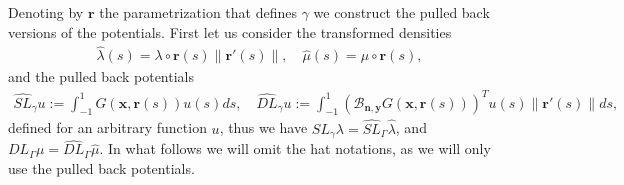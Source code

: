 \documentclass{article}
\newcommand{\bn}{\bm{n}}
\newcommand{\br}{\bm{r}}
\newcommand{\bx}{\bm{x}}
\newcommand{\by}{\bm{y}}
\begin{document}
Denoting by $\br$ the parametrization that defines $\gamma$ we construct the pulled back versions of the potentials. First let us consider the transformed densities 
\begin{align*}
\widehat{\lambda} (s) = \lambda \circ \br(s)  \| \br'(s) \|, \quad 
\widehat{\mu} (s) = \mu \circ \br(s),
\end{align*}
and the pulled back potentials 
\begin{align*}
\widehat{SL}_{\gamma} u := \int_{-1}^1 
 G(\bx,\br(s))  u(s) ds, \quad 
 \widehat{DL}_{\gamma} u := \int_{-1}^1 
 \left(\mathcal{B}_{\bn,\by}G(\bx,\br(s))\right)^T  u(s) \|\br'(s)\|ds,
\end{align*}
defined for an arbitrary function $u$, thus we have $SL_\gamma \lambda  = \widehat{SL}_\Gamma \widehat{\lambda}$, and $DL_\Gamma \mu  = \widehat{DL}_\Gamma \widehat{\mu}$. In what follows we will omit the hat notations, as we will only use the pulled back potentials. 
\end{document}
